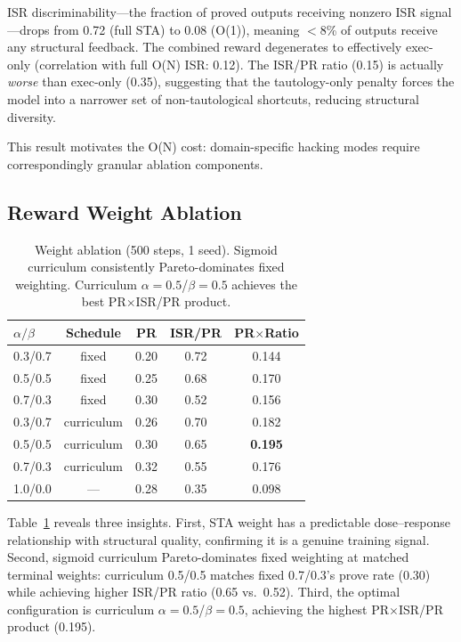 \documentclass[11pt,a4paper]{article}
\begin{document}
ISR discriminability---the fraction of proved outputs receiving nonzero ISR signal---drops from 0.72 (full STA) to 0.08 (O(1)), meaning $<$8\% of outputs receive any structural feedback. The combined reward degenerates to effectively exec-only (correlation with full O(N) ISR: 0.12). The ISR/PR ratio (0.15) is actually \emph{worse} than exec-only (0.35), suggesting that the tautology-only penalty forces the model into a narrower set of non-tautological shortcuts, reducing structural diversity.

This result motivates the O(N) cost: domain-specific hacking modes require correspondingly granular ablation components.

\subsection{Reward Weight Ablation}
\label{sec:weight_ablation}

\begin{table}[t]
\centering
\small
\begin{tabular}{lcccc}
\toprule
$\alpha/\beta$ & \textbf{Schedule} & \textbf{PR} & \textbf{ISR/PR} & \textbf{PR$\times$Ratio} \\
\midrule
0.3/0.7 & fixed & 0.20 & 0.72 & 0.144 \\
0.5/0.5 & fixed & 0.25 & 0.68 & 0.170 \\
0.7/0.3 & fixed & 0.30 & 0.52 & 0.156 \\
\midrule
0.3/0.7 & curriculum & 0.26 & 0.70 & 0.182 \\
0.5/0.5 & curriculum & 0.30 & 0.65 & \textbf{0.195} \\
0.7/0.3 & curriculum & 0.32 & 0.55 & 0.176 \\
\midrule
1.0/0.0 & --- & 0.28 & 0.35 & 0.098 \\
\bottomrule
\end{tabular}
\caption{Weight ablation (500 steps, 1 seed). Sigmoid curriculum consistently Pareto-dominates fixed weighting. Curriculum $\alpha{=}0.5$/$\beta{=}0.5$ achieves the best PR$\times$ISR/PR product.}
\label{tab:weight_ablation}
\end{table}

Table~\ref{tab:weight_ablation} reveals three insights. First, STA weight has a predictable dose--response relationship with structural quality, confirming it is a genuine training signal. Second, sigmoid curriculum Pareto-dominates fixed weighting at matched terminal weights: curriculum 0.5/0.5 matches fixed 0.7/0.3's prove rate (0.30) while achieving higher ISR/PR ratio (0.65 vs.\ 0.52). Third, the optimal configuration is curriculum $\alpha{=}0.5$/$\beta{=}0.5$, achieving the highest PR$\times$ISR/PR product (0.195).
\end{document}
